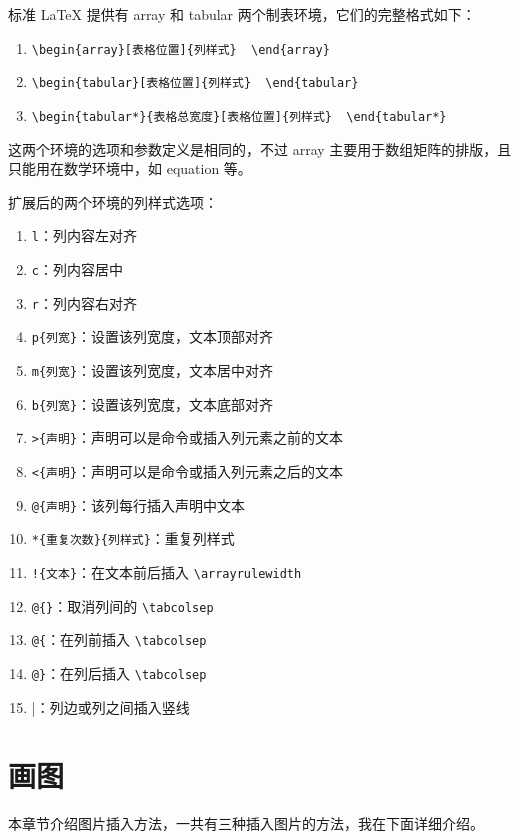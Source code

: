标准 LaTeX 提供有 array 和 tabular 两个制表环境，它们的完整格式如下：
\begin{enumerate}[label=(\arabic*)]
    \item \verb|\begin{array}[表格位置]{列样式}  \end{array}|

    \item \verb|\begin{tabular}[表格位置]{列样式}  \end{tabular}|
    
    \item \verb|\begin{tabular*}{表格总宽度}[表格位置]{列样式}  \end{tabular*}|
\end{enumerate}
这两个环境的选项和参数定义是相同的，不过 array 主要用于数组矩阵的排版，且只能用在数学环境中，如 equation 等。

扩展后的两个环境的列样式选项：

\begin{enumerate}[label=(\arabic*)]
    \item \verb|l|：列内容左对齐
    \item \verb|c|：列内容居中
    \item \verb|r|：列内容右对齐
    \item \verb|p{列宽}|：设置该列宽度，文本顶部对齐
    \item \verb|m{列宽}|：设置该列宽度，文本居中对齐
    \item \verb|b{列宽}|：设置该列宽度，文本底部对齐
    \item \verb|>{声明}|：声明可以是命令或插入列元素之前的文本
    \item \verb|<{声明}|：声明可以是命令或插入列元素之后的文本
    \item \verb|@{声明}|：该列每行插入声明中文本
    \item \verb|*{重复次数}{列样式}|：重复列样式
    \item \verb|!{文本}|：在文本前后插入 \verb|\arrayrulewidth|
    \item \verb|@{}|：取消列间的 \verb|\tabcolsep|
    \item \verb|@{|：在列前插入 \verb|\tabcolsep|
    \item \verb|@}|：在列后插入 \verb|\tabcolsep|
    \item \verb|||：列边或列之间插入竖线
\end{enumerate}

\section{画图}
本章节介绍图片插入方法，一共有三种插入图片的方法，我在下面详细介绍。
